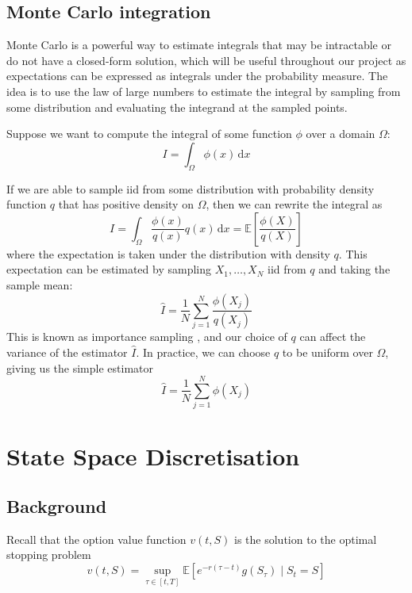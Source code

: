 \subsection{Monte Carlo integration}

Monte Carlo is a powerful way to estimate integrals that may be intractable or do not have a closed-form solution, which will be useful throughout our project as expectations can be expressed as integrals under the probability measure. The idea is to use the law of large numbers to estimate the integral by sampling from some distribution and evaluating the integrand at the sampled points.

Suppose we want to compute the integral of some function $\phi$ over a domain $\Omega$:
\begin{equation}
    I = \int_\Omega \phi(x)\,\mathrm dx
\end{equation}

If we are able to sample iid from some distribution with probability density function $q$ that has positive density on $\Omega$, then we can rewrite the integral as
\begin{equation}
    I = \int_\Omega \frac{\phi(x)}{q(x)} q(x) \,\mathrm dx = \mathbb E\left[\frac{\phi(X)}{q(X)}\right]
\end{equation}
where the expectation is taken under the distribution with density $q$. This expectation can be estimated by sampling $X_1, \dots, X_N$ iid from $q$ and taking the sample mean:
\begin{equation}
    \hat I = \frac 1N \sum_{j=1}^N \frac{\phi(X_j)}{q(X_j)}
\end{equation}
This is known as importance sampling \cite{akyildiz2025stochastic}, and our choice of $q$ can affect the variance of the estimator $\hat I$. In practice, we can choose $q$ to be uniform over $\Omega$, giving us the simple estimator
\begin{equation}
    \hat I = \frac{1}{N} \sum_{j=1}^N \phi(X_j)
\end{equation}

\section{State Space Discretisation}

\subsection{Background}

Recall that the option value function $v(t, S)$ is the solution to the optimal stopping problem
\begin{equation}
    v(t, S) = \sup_{\tau \in [t, T]} \mathbb E\left[ e^{-r(\tau - t)} g(S_\tau) \mid S_t = S \right]
\end{equation}

